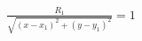\documentclass[preview]{standalone}
\begin{document}
\begin{align*}
\frac{R_1}{\sqrt{(x - x_1) ^ 2 + (y - y_1) ^ 2}} = 1
\end{align*}
\end{document}
